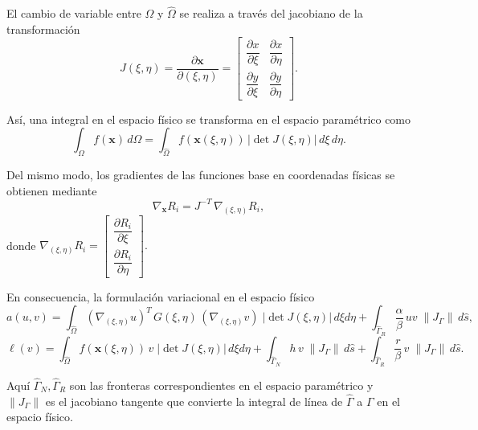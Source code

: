\documentclass[12pt]{article}
\begin{document}
\medskip

El cambio de variable entre $\Omega$ y $\hat{\Omega}$ se realiza a través del 
jacobiano de la transformación
\[
J(\xi,\eta) = \frac{\partial \mathbf{x}}{\partial (\xi,\eta)} 
= 
\begin{bmatrix}
\dfrac{\partial x}{\partial \xi} & \dfrac{\partial x}{\partial \eta} \\[8pt]
\dfrac{\partial y}{\partial \xi} & \dfrac{\partial y}{\partial \eta}
\end{bmatrix}.
\]

\medskip

Así, una integral en el espacio físico se transforma en el espacio paramétrico como
\[
\int_{\Omega} f(\mathbf{x}) \, d\Omega 
= \int_{\hat{\Omega}} f(\mathbf{x}(\xi,\eta)) \, \big|\det J(\xi,\eta)\big| \, d\xi \, d\eta.
\]

\medskip

Del mismo modo, los gradientes de las funciones base en coordenadas físicas se obtienen mediante
\[
\nabla_{\mathbf{x}} R_i = J^{-T} \, \nabla_{(\xi,\eta)} R_i,
\]
donde 
\(
\nabla_{(\xi,\eta)} R_i =
\begin{bmatrix}
\dfrac{\partial R_i}{\partial \xi} \\[6pt]
\dfrac{\partial R_i}{\partial \eta}
\end{bmatrix}.
\)

\medskip

En consecuencia, la formulación variacional en el espacio físico
\[
a(u,v) = \int_{\hat{\Omega}} (\nabla_{(\xi,\eta)} u)^T \, G(\xi,\eta) \, (\nabla_{(\xi,\eta)} v) \; |\det J(\xi,\eta)| \, d\xi d\eta
          + \int_{\hat{\Gamma}_R} \frac{\alpha}{\beta}\, u v \; \|J_\Gamma\| \, d\hat s,
\]
\[
\ell(v) = \int_{\hat{\Omega}} f(\mathbf{x}(\xi,\eta))\, v \; |\det J(\xi,\eta)| \, d\xi d\eta
          + \int_{\hat{\Gamma}_N} h \, v \; \|J_\Gamma\| \, d\hat s
          + \int_{\hat{\Gamma}_R} \frac{r}{\beta}\, v \; \|J_\Gamma\| \, d\hat s.
\]

Aquí \(\hat{\Gamma}_N, \hat{\Gamma}_R\) son las fronteras correspondientes en el espacio paramétrico y
\(\|J_\Gamma\|\) es el jacobiano tangente que convierte la integral de línea de \(\hat{\Gamma}\) a \(\Gamma\) en el espacio físico.
\end{document}
